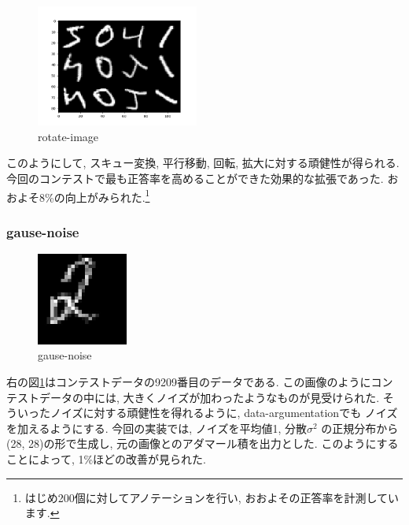 \documentclass[a4paper,11pt]{jsarticle}
\begin{document}
\begin{figure}[H]
  \centering
  \includegraphics[height = 4cm]{Figure_rotate.png}
  \caption{rotate-image}
\end{figure}

このようにして, スキュー変換, 平行移動, 回転, 拡大に対する頑健性が得られる.
今回のコンテストで最も正答率を高めることができた効果的な拡張であった.
おおよそ8\%の向上がみられた.\footnote{はじめ200個に対してアノテーションを行い, おおよその正答率を計測しています.}

\subsubsection*{gause-noise}
\begin{figure}
  \centering
  \includegraphics[width=3cm]{gause-noise.jpg}
  \caption{gause-noise}
  \label{gause}
\end{figure}

右の図\ref{gause}はコンテストデータの9209番目のデータである.
この画像のようにコンテストデータの中には, 大きくノイズが加わったようなものが見受けられた.
そういったノイズに対する頑健性を得れるように, data-argumentationでも
ノイズを加えるようにする. 今回の実装では, ノイズを平均値1, 分散$\sigma^{2}$
の正規分布から(28, 28)の形で生成し, 元の画像とのアダマール積を出力とした.
このようにすることによって, 1\%ほどの改善が見られた.
\end{document}
